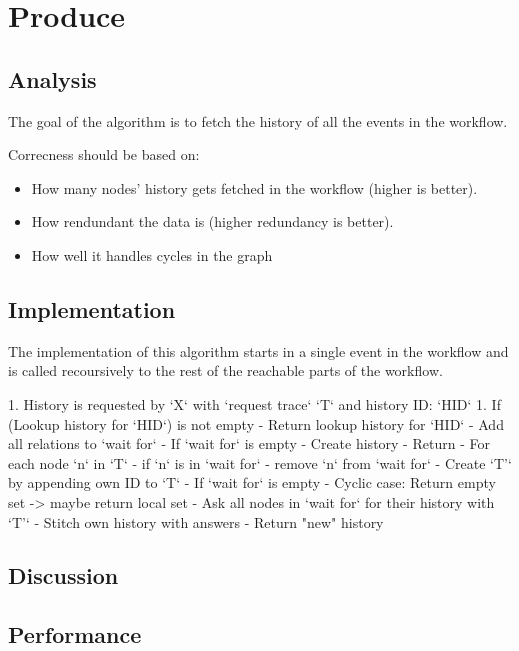 \section{Produce}
\subsection{Analysis} %
The goal of the algorithm is to fetch the history of all the events in the workflow.

Correcness should be based on:
\begin{itemize}
    \item How many nodes' history gets fetched in the workflow (higher is better).
    \item How rendundant the data is (higher redundancy is better).
    \item How well it handles cycles in the graph
\end{itemize}

\subsection{Implementation} %
The implementation of this algorithm starts in a single event in the workflow and is called recoursively to the rest of the reachable parts of the workflow.

 1. History is requested by `X` with `request trace` `T` and history ID: `HID`
    1. If (Lookup history for `HID`) is not empty
        - Return lookup history for `HID`
    - Add all relations to `wait for`
    - If `wait for` is empty
        - Create history
        - Return
    - For each node `n` in `T`
        - if `n` is in `wait for`
            - remove `n` from `wait for`
    - Create `T'` by appending own ID to `T`
    - If `wait for` is empty
        - Cyclic case: Return empty set -> maybe return local set
    - Ask all nodes in `wait for` for their history with `T'`
    - Stitch own history with answers
    - Return "new" history

\subsection{Discussion} %
\subsection{Performance} %